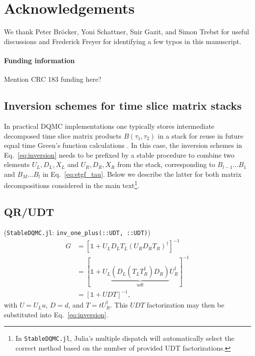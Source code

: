 \documentclass[submission, Phys]{SciPost}
\begin{document}
\section*{Acknowledgements}
We thank Peter Bröcker, Yoni Schattner, Snir Gazit, and Simon Trebst for useful discussions and Frederick Freyer for identifying a few typos in this manuscript.

\paragraph{Funding information}
Mention CRC 183 funding here?


\begin{appendix}

\section{Inversion schemes for time slice matrix stacks}

In practical DQMC implementations one typically stores intermediate decomposed time slice matrix products $B(\tau_1, \tau_2)$ in a stack for reuse in future equal time Green's function calculations \cite{Assaad2002a, Santos2003, Broecker2016}. In this case, the inversion schemes in Eq.~\eqref{eq:inversion} needs to be prefixed by a stable procedure to combine two elements $U_L, D_L, X_L$ and $U_R, D_R, X_R$ from the stack, corresponding to $B_{l-1}\dots B_1$ and $B_M \dots B_l$ in Eq.~\ref{eq:etgf_tau}. Below we describe the latter for both matrix decompositions considered in the main text\footnote{In \texttt{StableDQMC.jl}, Julia's multiple dispatch will automatically select the correct method based on the number of provided UDT factorizations.}.

\subsection{QR/UDT}

(\texttt{StableDQMC.jl}: \texttt{inv\_one\_plus(::UDT, ::UDT)})
\begin{align}
	G &= \left[\mathbb{1} + U_L D_L T_L \left( U_R D_R T_R \right)^\dagger \right]^{-1}\nonumber \\
	&= \left[\mathbb{1} + U_L \underbrace{\left( D_L \left( T_L T_R^\dagger \right) D_R \right)}_{udt} U_R^\dagger \right]^{-1} \\
	&= \left[\mathbb{1} + U D T \right]^{-1},\nonumber
\end{align}
with $U=U_Lu$, $D=d$, and $T=tU_R^\dagger$. This $UDT$ factorization may then be substituted into Eq.~\eqref{eq:inversion}.



\end{appendix}
\end{document}
